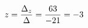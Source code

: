 \documentclass[preview]{standalone}
\begin{document}
\begin{align*}
\special{dvisvgm:raw <g id='unique000'>}z = \frac{\Delta_z}{\Delta} = \frac{63}{-21} = -3\special{dvisvgm:raw </g>}
\end{align*}
\end{document}
